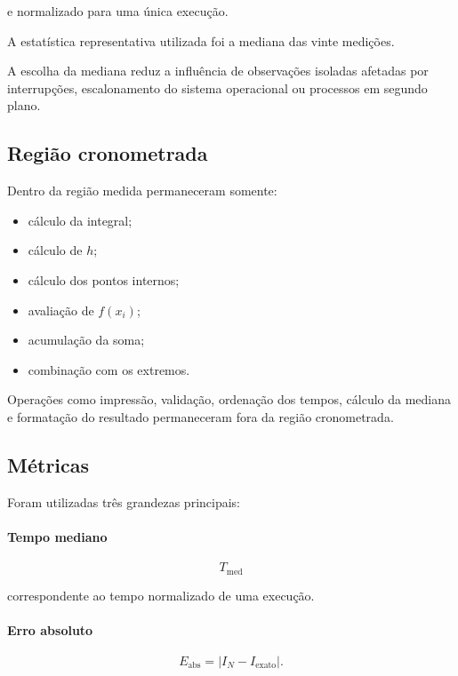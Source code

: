 e normalizado para uma única execução.

A estatística representativa utilizada foi a mediana das vinte medições.

A escolha da mediana reduz a influência de observações isoladas afetadas
por interrupções, escalonamento do sistema operacional ou processos em
segundo plano.

\subsection{Região cronometrada}

Dentro da região medida permaneceram somente:

\begin{itemize}
    \item cálculo da integral;
    \item cálculo de \(h\);
    \item cálculo dos pontos internos;
    \item avaliação de \(f(x_i)\);
    \item acumulação da soma;
    \item combinação com os extremos.
\end{itemize}

Operações como impressão, validação, ordenação dos tempos, cálculo da
mediana e formatação do resultado permaneceram fora da região cronometrada.

\subsection{Métricas}

Foram utilizadas três grandezas principais:

\paragraph{Tempo mediano}

\begin{equation}
    T_{\text{med}}
\end{equation}

correspondente ao tempo normalizado de uma execução.

\paragraph{Erro absoluto}

\begin{equation}
    E_{\text{abs}}
    =
    \left|
        I_N-I_{\text{exato}}
    \right|.
\end{equation}

